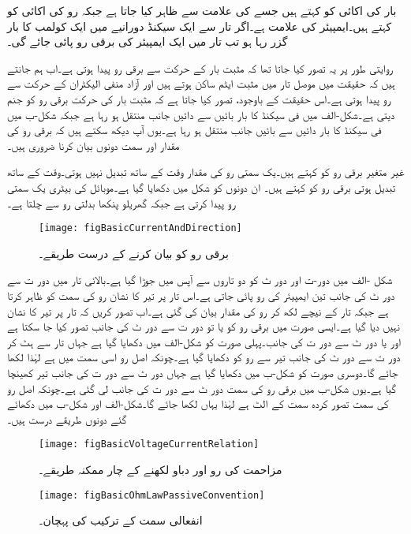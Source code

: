 بار کی اکائی کو  کہتے ہیں جسے  کی علامت سے ظاہر کیا جاتا ہے جبکہ رو کی اکائی کو  کہتے ہیں۔ایمپیئر کی علامت  ہے۔اگر تار سے ایک سیکنڈ دورانیے میں ایک کولمب کا بار گزر رہا ہو تب تار میں ایک ایمپیئر کی برقی رو پائی جائے گی۔

روایتی طور پر یہ تصور کیا جاتا تھا کہ مثبت بار کے حرکت سے برقی رو پیدا ہوتی ہے۔اب ہم جانتے ہیں کہ حقیقت میں موصل تار میں مثبت ایٹم ساکن ہوتے ہیں اور آزاد منفی الیکٹران کے  حرکت سے  رو پیدا ہوتی ہے۔اس حقیقت کے باوجود، تصور کیا جاتا ہے کہ مثبت بار کی حرکت برقی رو کو جنم دیتی ہے۔شکل-الف میں فی سیکنڈ  کا بار بائیں سے دائیں جانب منتقل ہو رہا ہے جبکہ شکل-ب میں فی سیکنڈ   کا بار دائیں سے بائیں جانب منتقل ہو رہا ہے۔یوں آپ دیکھ سکتے ہیں کہ برقی رو  کی مقدار اور سمت دونوں بیان کرنا ضروری ہیں۔

غیر متغیر برقی رو کو  کہتے ہیں۔یک سمتی رو کی مقدار وقت کے ساتھ تبدیل نہیں ہوتی۔وقت کے ساتھ تبدیل ہوتی برقی رو کو  کہتے ہیں۔ ان دونوں کو شکل میں دکھایا گیا ہے۔موبائل کی بیٹری یک سمتی رو پیدا کرتی ہے جبکہ گھریلو پنکھا بدلتی رو سے چلتا ہے۔
\begin{figure}
\centering
\texttt{[image: figBasicCurrentAndDirection]}
\caption{برقی رو کو بیان کرنے کے درست طریقے۔}
\label{شکل_بنیادی_رو_درست_بیان}
\end{figure}

شکل -الف میں دور-ت اور دور ٹ کو دو تاروں سے آپس میں جوڑا گیا ہے۔بالائی تار میں دور ت سے دور ٹ کی جانب تین ایمپیئر کی رو پائی جاتی ہے۔اس تار پر تیر کا نشان رو کی سمت کو ظاہر کرتا ہے جبکہ تار کے نیچے  لکھ کر رو کی مقدار بیان کی گئی ہے۔اب تصور کریں کہ تار پر تیر کا نشان نہیں دیا گیا ہے۔ایسی صورت میں برقی رو  کو یا تو دور ت سے دور ٹ کی جانب تصور کیا جا سکتا ہے اور یا دور ٹ سے دور ت کی جانب۔پہلی صورت کو شکل-الف میں دکھایا گیا ہے جہاں تار سے ہٹ کر دور ت سے دور ٹ کی جانب تیر سے رو  کو دکھایا گیا ہے۔چونکہ اصل رو اسی سمت میں ہے لہٰذا  لکھا جائے گا۔دوسری صورت کو شکل-ب میں دکھایا گیا ہے جہاں دور ٹ سے دور ت کی جانب تیر کھینچا گیا ہے۔یوں شکل-ب میں برقی رو کی سمت دور ٹ سے دور ت کی جانب لی گئی ہے۔چونکہ اصل رو کی سمت تصور کردہ سمت کے الٹ ہے لہٰذا یہاں  لکھا جائے گا۔شکل-الف اور شکل-ب میں دکھائے گئے دونوں طریقے درست ہیں۔
\begin{figure}
\centering
\texttt{[image: figBasicVoltageCurrentRelation]}
\caption{مزاحمت کی رو اور دباو لکھنے کے چار ممکنہ طریقے۔}
\label{شکل_بنیادی_غیر_عامل_ترکیب}
\end{figure}
%
\begin{figure}
\centering
\texttt{[image: figBasicOhmLawPassiveConvention]}
\caption{انفعالی سمت کے ترکیب کی پہچان۔}
\label{شکل_بنیادی_غیر_عامل_ترکیب_پہچان}
\end{figure}

